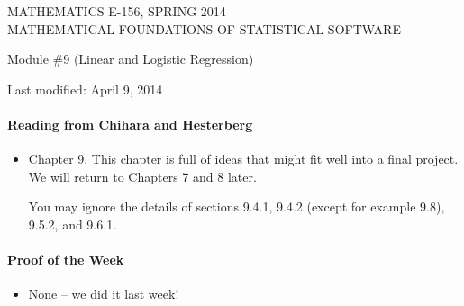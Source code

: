 \documentclass[12pt]{article}
\begin{document}
\begin{center}
MATHEMATICS E-156, SPRING 2014 \\
MATHEMATICAL FOUNDATIONS OF STATISTICAL SOFTWARE

\smallskip

Module \#9 (Linear and Logistic Regression)
\end{center}

Last modified: April 9, 2014

\medskip

\paragraph*{Reading from Chihara and Hesterberg}

\begin{itemize}
\item Chapter 9. This chapter is full of ideas that might fit well into a final project. We will return to Chapters 7 and 8 later.

You may ignore the details of sections 9.4.1, 9.4.2 (except for example 9.8), 9.5.2, and 9.6.1.

\end{itemize}


\paragraph*{Proof of the Week}
\begin{itemize}
\item None -- we did it last week!
\end{itemize}

\pagebreak
\end{document}
